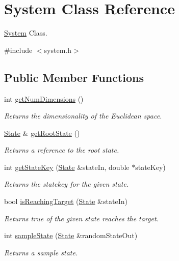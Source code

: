 \hypertarget{class_system}{\section{System Class Reference}
\label{class_system}
}


\hyperlink{class_system}{System} Class.  




{\ttfamily \#include $<$system.\-h$>$}

\subsection*{Public Member Functions}
\begin{DoxyCompactItemize}
\item 
int \hyperlink{class_system_af5fb452cbc77888fa8b237728978e5f2}{get\-Num\-Dimensions} ()
\begin{DoxyCompactList}\small\item\em Returns the dimensionality of the Euclidean space. \end{DoxyCompactList}\item 
\hyperlink{class_state}{State} \& \hyperlink{class_system_a3886ae2dd386330fcedbb80015c002d5}{get\-Root\-State} ()
\begin{DoxyCompactList}\small\item\em Returns a reference to the root state. \end{DoxyCompactList}\item 
int \hyperlink{class_system_a537a5a43d127e9680ac222b313621373}{get\-State\-Key} (\hyperlink{class_state}{State} \&state\-In, double $\ast$state\-Key)
\begin{DoxyCompactList}\small\item\em Returns the statekey for the given state. \end{DoxyCompactList}\item 
bool \hyperlink{class_system_a61f712ecec2be0d5a692016a98883505}{is\-Reaching\-Target} (\hyperlink{class_state}{State} \&state\-In)
\begin{DoxyCompactList}\small\item\em Returns true of the given state reaches the target. \end{DoxyCompactList}\item 
int \hyperlink{class_system_af69e823ebff537fd14b7129de2d8d24d}{sample\-State} (\hyperlink{class_state}{State} \&random\-State\-Out)
\begin{DoxyCompactList}\small\item\em Returns a sample state. \end{DoxyCompactList}\item 

\end{DoxyCompactItemize}

